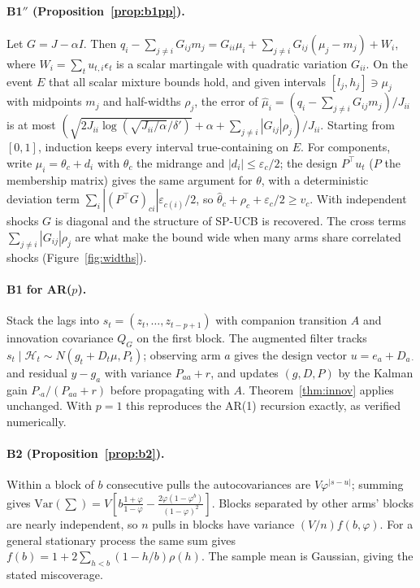 \documentclass[11pt]{article}
\theoremstyle{definition}
\theoremstyle{remark}
\newcommand{\Var}{\mathrm{Var}}
\begin{document}
\paragraph{B1$''$ (Proposition~\ref{prop:b1pp}).} Let $G=J-\alpha I$. Then $q_i-\sum_{j\ne i}G_{ij}m_j=G_{ii}\mu_i+\sum_{j\ne i}G_{ij}(\mu_j-m_j)+W_i$, where $W_i=\sum_tu_{t,i}\epsilon_t$ is a scalar martingale with quadratic variation $G_{ii}$. On the event $E$ that all scalar mixture bounds hold, and given intervals $[l_j,h_j]\ni\mu_j$ with midpoints $m_j$ and half-widths $\rho_j$, the error of $\hat\mu_i=(q_i-\sum_{j\ne i}G_{ij}m_j)/J_{ii}$ is at most $(\sqrt{2J_{ii}\log(\sqrt{J_{ii}/\alpha}/\delta')}+\alpha+\sum_{j\ne i}|G_{ij}|\rho_j)/J_{ii}$. Starting from $[0,1]$, induction keeps every interval true-containing on $E$. For components, write $\mu_i=\theta_c+d_i$ with $\theta_c$ the midrange and $|d_i|\le\varepsilon_c/2$; the design $P^\top u_t$ ($P$ the membership matrix) gives the same argument for $\theta$, with a deterministic deviation term $\sum_i|(P^\top G)_{ci}|\varepsilon_{c(i)}/2$, so $\hat\theta_c+\rho_c+\varepsilon_c/2\ge v_c$. With independent shocks $G$ is diagonal and the structure of SP-UCB is recovered. The cross terms $\sum_{j\ne i}|G_{ij}|\rho_j$ are what make the bound wide when many arms share correlated shocks (Figure~\ref{fig:widths}).

\paragraph{B1 for AR($p$).} Stack the lags into $s_t=(z_t,\dots,z_{t-p+1})$ with companion transition $A$ and innovation covariance $Q_G$ on the first block. The augmented filter tracks $s_t\mid\mathcal H_t\sim N(g_t+D_t\mu,P_t)$; observing arm $a$ gives the design vector $u=e_a+D_{a\cdot}$ and residual $y-g_a$ with variance $P_{aa}+r$, and updates $(g,D,P)$ by the Kalman gain $P_{\cdot a}/(P_{aa}+r)$ before propagating with $A$. Theorem~\ref{thm:innov} applies unchanged. With $p=1$ this reproduces the AR(1) recursion exactly, as verified numerically.

\paragraph{B2 (Proposition~\ref{prop:b2}).} Within a block of $b$ consecutive pulls the autocovariances are $V\varphi^{|s-u|}$; summing gives $\Var(\sum)=V[b\frac{1+\varphi}{1-\varphi}-\frac{2\varphi(1-\varphi^b)}{(1-\varphi)^2}]$. Blocks separated by other arms' blocks are nearly independent, so $n$ pulls in blocks have variance $(V/n)f(b,\varphi)$. For a general stationary process the same sum gives $f(b)=1+2\sum_{h<b}(1-h/b)\rho(h)$. The sample mean is Gaussian, giving the stated miscoverage.
\end{document}
